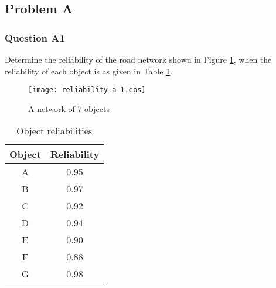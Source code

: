 \subsection{Problem A}
\subsubsection{Question A1}
Determine the reliability of the road network shown in Figure \ref{reliability-a-1}, when
the reliability of each object is as given in Table \ref{tbl-reliability-a:1}.
\begin{figure}[h]
\texttt{[image: reliability-a-1.eps]}
\caption{A network of 7 objects}\label{reliability-a-1}
\end{figure}
\begin{table}[h]
\caption{Object reliabilities}
\begin{tabular}{|l|l|}
\hline
\multicolumn{1}{|c|}{Object} & \multicolumn{1}{c|}{Reliability} \\ 
\hline
\multicolumn{1}{|c|}{A} & \multicolumn{1}{c|}{0.95} \\ 
\hline
\multicolumn{1}{|c|}{B} & \multicolumn{1}{c|}{0.97} \\ 
\hline
\multicolumn{1}{|c|}{C} & \multicolumn{1}{c|}{0.92} \\ 
\hline
\multicolumn{1}{|c|}{D} & \multicolumn{1}{c|}{0.94} \\ 
\hline
\multicolumn{1}{|c|}{E} & \multicolumn{1}{c|}{0.90} \\ 
\hline
\multicolumn{1}{|c|}{F} & \multicolumn{1}{c|}{0.88} \\ 
\hline
\multicolumn{1}{|c|}{G} & \multicolumn{1}{c|}{0.98} \\ 
\hline
\end{tabular}
\label{tbl-reliability-a:1}\end{table}
